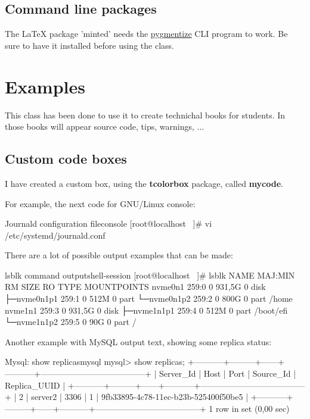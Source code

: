 \documentclass{\ClassPath/yukibook}
\begin{document}
\section{Command line packages}
The \LaTeX{} package 'minted' needs the \href{https://pygments.org/}{pygmentize} CLI program to work. Be sure to have it installed before using the class.


\chapter{Examples}
This class has been done to use it to create technichal books for students. In those books will appear source code, tips, warnings, ...

\section{Custom code boxes}
I have created a custom box, using the \textbf{tcolorbox} package, called \textbf{mycode}.

For example, the next code for GNU/Linux console:

\begin{mycode}{Journald configuration file}{console}{}
[root@localhost ~]# vi /etc/systemd/journald.conf
\end{mycode}

There are a lot of possible output examples that can be made:

\begin{mycode}{lsblk command output}{shell-session}{}
[root@localhost ~]# lsblk
NAME                       MAJ:MIN RM   SIZE RO TYPE MOUNTPOINTS
nvme0n1                    259:0    0 931,5G  0 disk
├─nvme0n1p1                259:1    0   512M  0 part
└─nvme0n1p2                259:2    0   800G  0 part /home
nvme1n1                    259:3    0 931,5G  0 disk
├─nvme1n1p1                259:4    0   512M  0 part /boot/efi
└─nvme1n1p2                259:5    0    90G  0 part /
\end{mycode}


Another example with MySQL output text, showing some replica status:

\begin{mycode}{Mysql: show replicas}{mysql}{\footnotesize}
mysql> show replicas;
+-----------+---------+------+-----------+--------------------------------------+
| Server_Id | Host    | Port | Source_Id | Replica_UUID                         |
+-----------+---------+------+-----------+--------------------------------------+
|         2 | server2 | 3306 |         1 | 9fb33895-4c78-11ec-b23b-525400f50be5 |
+-----------+---------+------+-----------+--------------------------------------+
1 row in set (0,00 sec)
\end{mycode}
\end{document}
